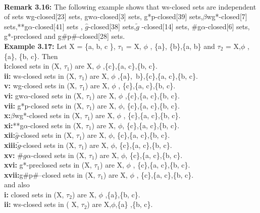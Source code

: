{{			\\\textbf{Remark 3.16:}  The following example shows that ws-closed sets are independent of  sets   wg-closed[23] sets, gw$\alpha$-closed[3] sets, g*p-closed[39] sets,$\beta$wg*-closed[7] sets,**g$\alpha$-closed[41] sets , $ \hat{g}$-closed[38] sets,$\tilde{g}$ -closed[14] sets, $\#$g$\alpha$-closed[6] sets,  g*-preclosed
			and g$\#$p$\#$-closed[28] sets.
			\\\textbf{Example 3.17:} Let X = \{a, b, c \}, $ \tau_{1}$ = { X, $\phi$ , \{a\}, \{b\},\{a, b\}} and  $ \tau_{2}$ = { X,$\phi$ ,\{a\}, \{b, c\}}. Then
			\\\textbf{i:}closed sets in (X,  $ \tau_{1}$) are X, $\phi$ ,\{c\},\{a, c\},\{b, c\}.
			\\\textbf{ii:}	ws-closed sets in (X,  $ \tau_{1}$) are X, $\phi$ ,\{a\},\ {b\},\{c\},\{a, c\},\{b, c\}.
				\\\textbf{v:}	wg-closed sets in (X,  $ \tau_{1}$) are X, $\phi$ , \{c\},\{a, c\},\{b, c\}.
				\\\textbf{vi:}	gw$\alpha$-closed sets in (X,  $ \tau_{1}$) are X, $\phi$ ,\{c\},\{a, c\},\{b, c\}.
				\\\textbf{vii:}	 g*p-closed sets in (X,  $ \tau_{1}$) are X,  $\phi$, \{c\},\{a, c\},\{b, c\}.
				\\\textbf{x:}$\beta$wg*-closed sets in (X,  $ \tau_{1}$) are X, $\phi$ , \{c\},\{a, c\},\{b, c\}.
				\\\textbf{xi:}**g$\alpha$-closed sets in (X,  $ \tau_{1}$) are X,  $\phi$, \{c\},\{a, c\},\{b, c\}.
				\\\textbf{xii:}$\hat{g}$-closed sets in (X,  $ \tau_{1}$) are X,  $\phi$, \{c\},\{a, c\},\{b, c\}.
				\\\textbf{xiii:}$\tilde{g}$-closed sets in (X,  $ \tau_{1}$) are X,  $\phi$, \{c\},\{a, c\},\{b, c\}.
				\\\textbf{xv:}	$\#g$$\alpha$-closed sets  in (X,  $ \tau_{1}$) are X,  $\phi$, \{c\},\{a, c\},\{b, c\}.
				\\\textbf{xvi:}	g*-preclosed sets in (X,  $ \tau_{1}$) are X, $\phi$ , \{c\},\{a, c\},\{b, c\}.
				\\\textbf{xvii:}g$\#$p$\#$--closed sets in (X,  $ \tau_{1}$) are X, $\phi$ , \{c\},\{a, c\},\{b, c\}.
				\\and also
				\\\textbf{i:}	closed sets in (X,  $ \tau_{2}$) are X, $\phi$ ,\{a\},\{b, c\}.
				\\\textbf{ii:}	ws-closed sets in ( X,  $ \tau_{2}$) are X,$\phi$,\{a\} ,\{b, c\}.
$$}}}
